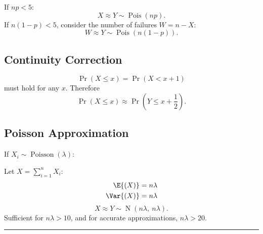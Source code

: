 \documentclass{article}
\begin{document}
\begin{minipage}{126.1962963mm}
\begin{multicols}{2}
        If \(np < 5\):
        \begin{equation*}
            X \approx Y \sim \operatorname{Pois}{\left( np \right)}.
        \end{equation*}
        If \(n\left( 1 - p \right) < 5\), consider the number of failures \(W = n - X\):
        \begin{equation*}
            W \approx Y \sim \operatorname{Pois}{\left( n\left( 1 - p \right) \right)}.
        \end{equation*}
        \subsection{Continuity Correction}
        \begin{equation*}
            \Pr{\left( X \leq x \right)} = \Pr{\left( X < x + 1 \right)}
        \end{equation*}
        must hold for any \(x\). Therefore
        \begin{equation*}
            \Pr{\left( X \leq x \right)} \approx \Pr{\left( Y \leq x + \frac{1}{2} \right)}.
        \end{equation*}
        \subsection{Poisson Approximation}
        If \(X_i \sim \operatorname{Poisson}{\left( \lambda \right)}\):

        Let \(X = \sum_{i = 1}^n X_i\):
        \begin{align*}
            \E{\left( X \right)}   & = n \lambda \\
            \Var{\left( X \right)} & = n \lambda
        \end{align*}
        \begin{equation*}
            X \approx Y \sim \operatorname{N}{\left( n\lambda,\: n\lambda \right)}.
        \end{equation*}
        Sufficient for \(n \lambda > 10\), and for accurate approximations, \(n \lambda > 20\).
    \end{multicols}
\end{minipage}
\hrule
\end{document}
